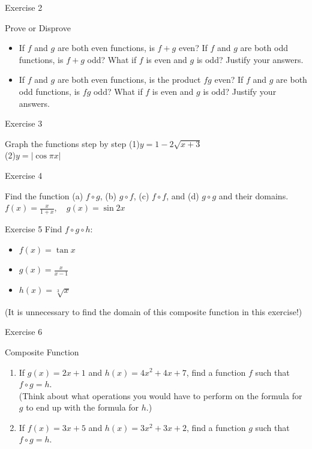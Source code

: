\begin{frame}{Exercise 2}
    \begin{block}{Prove or Disprove}
        \begin{itemize}
            \item If $f$ and $g$ are both even functions, is $f+g$ even? If $f$ and $g$ are both odd functions, is $f+g$ odd? What if $f$ is even and $g$ is odd? Justify your answers.
            \item If $f$ and $g$ are both even functions, is the product $f g$ even? If $f$ and $g$ are both odd functions, is $f g$ odd? What if $f$ is even and $g$ is odd? Justify your answers.
        \end{itemize}
    \end{block}
\end{frame}

\begin{frame}{Exercise 3}
    \begin{block}{Graph the functions step by step}
        (1)$y=1-2 \sqrt{x+3}$\\
        (2)$y=|\cos \pi x|$
    \end{block}
\end{frame}


\begin{frame}{Exercise 4}
    \begin{block}{Find the function (a) $f \circ g$, (b) $g \circ f$, (c) $f \circ f$, and (d) $g \circ g$ and their domains.}
        $f(x)=\frac{x}{1+x}, \quad g(x)=\sin 2 x$\\
    \end{block}
\end{frame}

\begin{frame}{Exercise 5}
    Find $f \circ g\circ h$:\\
    \begin{itemize}
        \item $f(x)=\tan x$
        \item $g(x)=\frac{x}{x-1}$
        \item $h(x)=\sqrt[3]{x}$
    \end{itemize}
    (It is unnecessary to find the domain of this composite function in this exercise!)
\end{frame}

\begin{frame}{Exercise 6}
    \begin{block}{Composite Function}
        \begin{enumerate}
            \item If $g(x)=2 x+1$ and $h(x)=4 x^{2}+4 x+7$, find a function $f$ such that $f \circ g=h$. \\(Think about what operations you would have to perform on the formula for $g$ to end up with the formula for $h$.)\\
            \item If $f(x)=3 x+5$ and $h(x)=3 x^{2}+3 x+2$, find a function $g$ such that $f \circ g=h$.\\
        \end{enumerate}
    \end{block}
\end{frame}

